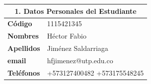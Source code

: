 \documentclass[letter,12pt]{article}
\begin{document}
\sloppy %
\renewcommand{\arraystretch}{1.1} %
\begin{center}
\begin{tabular}{|p{5.5cm}|p{9.5cm}|}
\hline
\multicolumn{2}{|c|}{\textbf{1. Datos Personales del Estudiante}}\\
\hline
\textbf{Código} & 1115421345 \\
\hline
\textbf{Nombres} & Héctor Fabio\\
\hline
\textbf{Apellidos} & Jiménez Saldarriaga\\
\hline
\textbf{email} & hfjimenez@utp.edu.co \\
\hline
\textbf{Teléfonos} & +573127400482 +573175548245 \\
\hline
\end{tabular}
\end{center}
\end{document}
